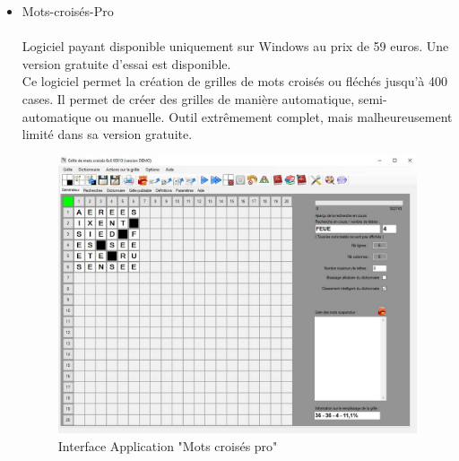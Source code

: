 \documentclass [ 11 pt ] {article}
\begin{document}
\begin{itemize}
         \item Mots-croisés-Pro \cite{At}
        \\ 
        \\ Logiciel payant disponible uniquement sur Windows au prix de 59 euros. Une version gratuite d’essai est disponible.
        \\ Ce logiciel permet la création de grilles de mots croisés ou fléchés jusqu'à 400 cases. Il permet de créer des grilles de manière automatique, semi-automatique ou manuelle.
        Outil extrêmement complet, mais malheureusement limité dans sa version gratuite.
        
        \begin{center}
            \begin{figure}[H]
                \begin{center}
                    \includegraphics[scale=0.45]{mots croises pro.jpg}
                    \caption{Interface Application "Mots croisés pro" }
                    \label{Pres}
                \end{center}
            \end{figure}
        \end{center}
    
    \end{itemize}
        
\end{document}
